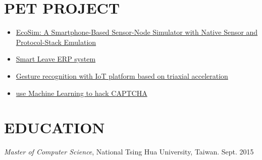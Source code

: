 \documentclass{res}
\begin{document}
\begin{resume}
			\vspace{-0.1in}
			\section{PET PROJECT}
			\begin{itemize}
					\item \href{https://www.youtube.com/watch?v=1UUcqf0pjM0}{EcoSim: A Smartphone-Based Sensor-Node Simulator with Native Sensor and Protocol-Stack Emulation}
					\vspace{-0.05in}
					\item \href{https://www.youtube.com/watch?v=H-oOH0-n7_4}{Smart Leave ERP system}
					\vspace{-0.05in}
					\item \href{https://www.youtube.com/watch?v=VInyJABrmPo}{Gesture recognition with IoT platform based on triaxial acceleration}  
					\vspace{-0.05in}
					\item  \href{https://www.youtube.com/watch?v=9ovWzIu1zy8}{use Machine Learning to hack CAPTCHA}							
			\end{itemize}
			\vspace{-0.18in}
			\section{EDUCATION}
			\vspace{0.1in}
				{\sl Master of Computer Science}, National Tsing Hua University, Taiwan. \hfill Sept. 2015\\
				

				          
			 
		\end{resume}
	
\end{document}
